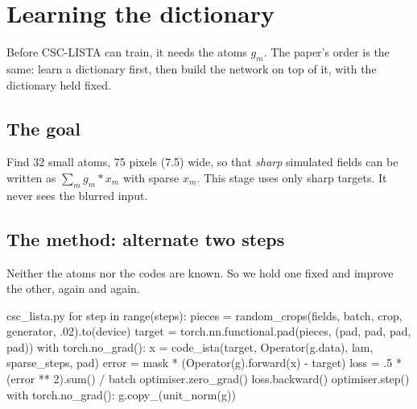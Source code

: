 \chapter{Learning the dictionary}\label{ch:dictionary}

Before CSC-LISTA can train, it needs the atoms $g_m$. The paper's order is the same: learn a dictionary
first, then build the network on top of it, with the dictionary held fixed.

\section{The goal}

Find 32 small atoms, 75 pixels (7.5\um) wide, so that \emph{sharp} simulated fields can be written as
$\sum_m g_m*x_m$ with sparse $x_m$. This stage uses only sharp targets. It never sees the blurred input.

\section{The method: alternate two steps}

Neither the atoms nor the codes are known. So we hold one fixed and improve the other, again and again.

\begin{center}
\end{center}

\begin{code*}{csc_lista.py}
    for step in range(steps):
        pieces = random_crops(fields, batch, crop, generator, .02).to(device)
        target = torch.nn.functional.pad(pieces, (pad, pad, pad, pad))
        with torch.no_grad():
            x = code_ista(target, Operator(g.data), lam, sparse_steps, pad)
        error = mask * (Operator(g).forward(x) - target)
        loss = .5 * (error ** 2).sum() / batch
        optimiser.zero_grad()
        loss.backward()
        optimiser.step()
        with torch.no_grad():
            g.copy_(unit_norm(g))
\end{code*}

